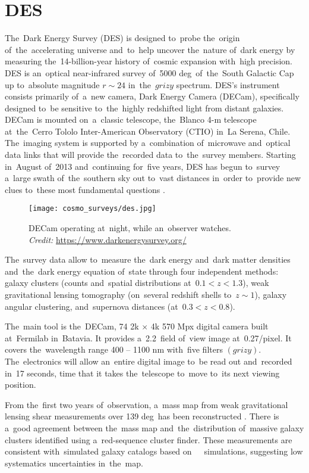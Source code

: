 \section{DES}
\label{DES}
The~Dark Energy Survey (DES) is designed to~probe the~origin of~the~accelerating universe and~to~help uncover the~nature of~dark energy by measuring the~\mbox{14-billion-year} history of~cosmic expansion with~high precision. DES is an~optical near-infrared survey of~5000 deg\sq\ of~the~South Galactic Cap up to~absolute magnitude $r\sim24$ in~the~$grizy$ spectrum. DES's instrument consists primarily of~a~new camera, Dark Energy Camera (DECam), specifically designed to~be sensitive to~the~highly redshifted light from distant galaxies. DECam is mounted on~a~classic telescope, the~Blanco 4-m telescope at~the~Cerro Tololo Inter-American Observatory (CTIO) in~La Serena, Chile. The~imaging system is supported by a~combination of~microwave and~optical data links that will provide the~recorded data to~the~survey members. Starting in~August of~2013 and~continuing for~five years, DES has begun to~survey a~large swath of~the~southern sky out to~vast distances in~order to~provide new clues to~these most fundamental questions \cite{DES}.

\begin{figure}[htb]
    \centering
    \texttt{[image: cosmo\_surveys/des.jpg]}
    \caption{DECam operating at~night, while an~observer watches.\\\textit{Credit:} \url{https://www.darkenergysurvey.org/}}
    \label{fig:des}
\end{figure}
The~survey data allow to~measure the~dark energy and~dark matter densities and~the~dark energy equation of~state through four independent methods: galaxy clusters (counts and~spatial distributions at~$0.1<z<1.3$), weak gravitational lensing tomography (on~several redshift shells to~$z\sim1$), galaxy angular clustering, and~supernova distances (at~$0.3<z<0.8$).

The~main tool is the~DECam, 74 2k $\times$ 4k 570 Mpx digital camera built at~Fermilab in~Batavia. It provides a~2.2\textdegree\ field of~view image at~0.27\arcsec/pixel. It covers the~wavelength range 400 -- 1100 nm with~five filters $(grizy)$. The~electronics will allow an~entire digital image to~be read out and~recorded in~17 seconds, time that it takes the~telescope to~move to~its next viewing position.

From the~first two years of~observation, a~mass map from weak gravitational lensing shear measurements over 139 deg\sq\ has been reconstructed \cite{DES_mass}. There is a~good agreement between the~mass map and~the~distribution of~massive galaxy clusters identified using a~red-sequence cluster finder. These measurements are consistent with~simulated galaxy catalogs based on~\LCDM\ \nbody\ simulations, suggesting low systematics uncertainties in~the~map.

